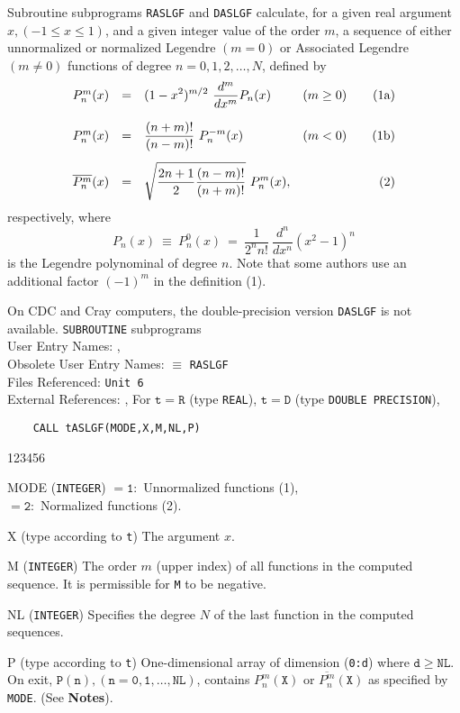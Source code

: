                               
                        
\Submitter{}                                  
                        
Subroutine subprograms {\tt RASLGF} and {\tt DASLGF} calculate,
for a given real argument
$x,(-1 \le x \le 1)$, and a given integer value of the order $m$,
a sequence of either unnormalized or normalized Legendre $(m=0)$ or
Associated Legendre $(m \ne 0)$ functions of
degree $n = 0,1,2,\ldots,N$, defined by
$$\begin{array}{l@{\quad=\quad}ll@{\qquad}r}
P_n^m(x) & \displaystyle(1-x^2)^{m/2} \
\frac{d^m}{dx^m}P_n(x) & (m \ge 0) & {\rm (1a)} \\[5mm]
P_n^m(x) & \displaystyle\frac{(n+m)!}{(n-m)!} \ P_n^{-m}(x) &
(m<0) & {\rm (1b)} \\[5mm]
\overline{P_n^m}(x) &
\displaystyle \sqrt{\frac{2n+1}{2}\frac{(n-m)!}{(n+m)!}}
\ P_n^m(x), & & (2)
\end{array}$$
respectively, where
$$ P_n(x) \ \equiv \ P_n^0(x) \ = \
\displaystyle\frac{1}{2^n n!} \ \frac{d^n}{dx^n}(x^2-1)^n $$
is the Legendre polynominal of degree $n$.
Note that some authors use an
additional factor $(-1)^m$ in the definition (1).
\par
On CDC and Cray computers,
the double-precision version {\tt DASLGF} is not available.
\Structure
{\tt SUBROUTINE} subprograms \\
User Entry Names: , \\
Obsolete User Entry Names:  $\equiv$ {\tt RASLGF}\\
Files Referenced: {\tt Unit 6} \\
External References: \Rind{MTLMTR}{N002}, \Rind{ABEND}{Z035}
\Usage
For $\mathtt{t=R}$ (type {\tt REAL}), $\mathtt{t=D}$ (type
{\tt DOUBLE PRECISION}),
\begin{verbatim}
    CALL tASLGF(MODE,X,M,NL,P)
\end{verbatim}
\begin{DLtt}{123456}
\item[MODE] ({\tt INTEGER}) $\mathtt{= 1:}$ Unnormalized functions (1),\\
 $\mathtt{= 2:}$ Normalized functions (2).
\item[X] (type according to {\tt t}) The argument $x$.
\item[M]({\tt INTEGER}) The order $m$ (upper index) of all functions in
the computed sequence. It is permissible for {\tt M} to be negative.
\item[NL]({\tt INTEGER}) Specifies the degree $N$ of the last
function in the computed sequences.
\item[P] (type according to {\tt t}) One-dimensional array of
dimension ({\tt 0:d}) where $\mathtt{d} \ge \mathtt{NL}$. \\
On exit, $\mathtt{P(n),(n=0,1,\ldots,NL)}$, contains $P_n^m
(\mathtt{X})$ or $\overline{P_n^m}(\mathtt{X})$ as
specified by {\tt MODE}. (See {\bf Notes}).
\end{DLtt}
